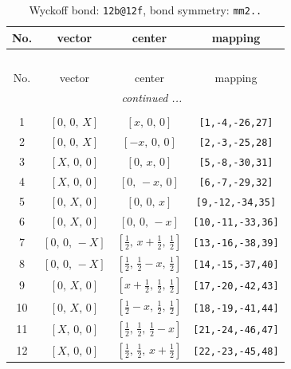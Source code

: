\documentclass[fleqn,8pt]{jsarticle}
\begin{document}
\renewcommand{\arraystretch}{1.2}
\begin{longtable}{cccc}
\caption{Wyckoff bond: {\tt 12b@12f}, bond symmetry: {\tt mm2..}}
 \\
 \hline \hline
No. & vector & center & mapping \\ \hline \endfirsthead

\multicolumn{3}{l}{\tablename\ \thetable{}} \\
 \hline \hline
No. & vector & center & mapping \\ \hline \endhead

 \hline \hline
\multicolumn{3}{r}{\footnotesize\it continued ...} \\ \endfoot

 \hline \hline
\multicolumn{3}{r}{} \\ \endlastfoot

1 & $\left[ 0,\, 0,\, X \right]$ & $\left[ x,\, 0,\, 0 \right]$ & {\tt [1,-4,-26,27]} \\ \hline
2 & $\left[ 0,\, 0,\, X \right]$ & $\left[ - x,\, 0,\, 0 \right]$ & {\tt [2,-3,-25,28]} \\ \hline
3 & $\left[ X,\, 0,\, 0 \right]$ & $\left[ 0,\, x,\, 0 \right]$ & {\tt [5,-8,-30,31]} \\ \hline
4 & $\left[ X,\, 0,\, 0 \right]$ & $\left[ 0,\, - x,\, 0 \right]$ & {\tt [6,-7,-29,32]} \\ \hline
5 & $\left[ 0,\, X,\, 0 \right]$ & $\left[ 0,\, 0,\, x \right]$ & {\tt [9,-12,-34,35]} \\ \hline
6 & $\left[ 0,\, X,\, 0 \right]$ & $\left[ 0,\, 0,\, - x \right]$ & {\tt [10,-11,-33,36]} \\ \hline
7 & $\left[ 0,\, 0,\, - X \right]$ & $\left[ \frac{1}{2},\, x + \frac{1}{2},\, \frac{1}{2} \right]$ & {\tt [13,-16,-38,39]} \\ \hline
8 & $\left[ 0,\, 0,\, - X \right]$ & $\left[ \frac{1}{2},\, \frac{1}{2} - x,\, \frac{1}{2} \right]$ & {\tt [14,-15,-37,40]} \\ \hline
9 & $\left[ 0,\, X,\, 0 \right]$ & $\left[ x + \frac{1}{2},\, \frac{1}{2},\, \frac{1}{2} \right]$ & {\tt [17,-20,-42,43]} \\ \hline
10 & $\left[ 0,\, X,\, 0 \right]$ & $\left[ \frac{1}{2} - x,\, \frac{1}{2},\, \frac{1}{2} \right]$ & {\tt [18,-19,-41,44]} \\ \hline
11 & $\left[ X,\, 0,\, 0 \right]$ & $\left[ \frac{1}{2},\, \frac{1}{2},\, \frac{1}{2} - x \right]$ & {\tt [21,-24,-46,47]} \\ \hline
12 & $\left[ X,\, 0,\, 0 \right]$ & $\left[ \frac{1}{2},\, \frac{1}{2},\, x + \frac{1}{2} \right]$ & {\tt [22,-23,-45,48]} \\
\end{longtable}
\end{document}
